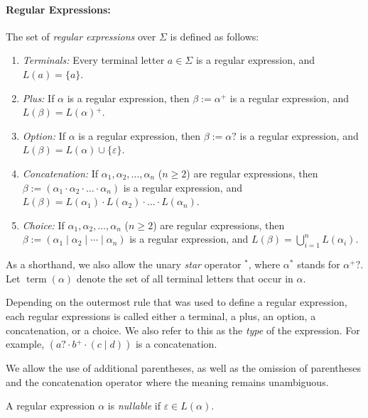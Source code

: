 \documentclass[a4paper,11pt, svgnames,titlepage]{article}
\newcommand{\rxp}{{^\mathtt{+}}}
\newcommand{\rxs}{{^\mathtt{*}}}
\newcommand{\rxo}{\mathtt{?}}
\newcommand{\rxc}{\cdot}
\DeclareMathOperator{\ror}{\mathtt{|}}
\newcommand{\emptyword}{\varepsilon}
\newcommand{\df}{:=}
\DeclareMathOperator{\term}{term}
\begin{document}
\paragraph{Regular Expressions:} The set of \emph{regular expressions} over $\Sigma$ is defined as follows:
\begin{enumerate}
	\item \emph{Terminals:} Every terminal letter $a\in \Sigma$ is a regular expression, and $L(a)=\{a\}$.
	\item \emph{Plus:} If $\alpha$ is a regular expression, then $\beta\df\alpha\rxp$ is a regular expression, and $L(\beta)=L(\alpha)\rxp$.
	\item \emph{Option:} If $\alpha$ is a regular expression, then $\beta\df\alpha\rxo$ is a regular expression, and $L(\beta)=L(\alpha)\cup\{\emptyword\}$.
	\item \emph{Concatenation:} If $\alpha_1,\alpha_2,\ldots,\alpha_n$ ($n\geq 2$) are regular expressions, then $\beta\df(\alpha_1\rxc \alpha_2 \rxc \ldots \rxc \alpha_n)$ is a regular expression, and $L(\beta)=L(\alpha_1)\cdot L(\alpha_2)\cdot \ldots \cdot L(\alpha_n)$.
	\item \emph{Choice:} If $\alpha_1,\alpha_2,\ldots,\alpha_n$ ($n\geq 2$) are regular expressions, then $\beta\df(\alpha_1\ror \alpha_2 \ror \cdots \ror \alpha_n)$ is a regular expression, and $L(\beta)=\bigcup_{i=1}^{n} L(\alpha_i)$.
\end{enumerate}
As a shorthand, we also allow the unary \emph{star} operator $\rxs$, where $\alpha\rxs$ stands for $\alpha\rxp\rxo$. Let $\term(\alpha)$ denote the set of all terminal letters that occur in $\alpha$.

Depending on the outermost rule that was used to define a regular expression, each regular expressions is called either a terminal, a plus, an option, a concatenation, or a choice. We also refer to this as the \emph{type} of the expression. For example, $(a\rxo \rxc b\rxp \rxc (c\ror d))$ is a concatenation.

We allow the use of additional parentheses, as well as the omission of parentheses and the concatenation operator where the meaning remains unambiguous.

A regular expression $\alpha$ is \emph{nullable} if $\emptyword\in L(\alpha)$.
\end{document}
